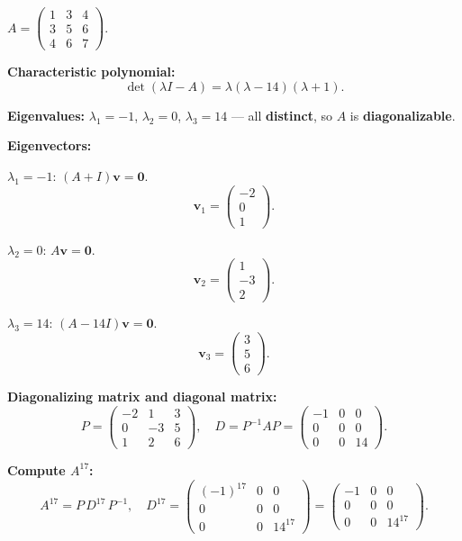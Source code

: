 \documentclass[12pt,a3paper]{article}
\begin{document}
 
\begin{tcolorbox}[enhanced,breakable,
  colback=cE!4,colframe=cE,boxrule=0.8pt,arc=5pt,
  title={\textbf{Answer --- Diagonalization of $A$; Compute $A^{17}$}},
  fonttitle=\bfseries\color{white},colbacktitle=cE]
 
$A=\begin{pmatrix}1&3&4\\3&5&6\\4&6&7\end{pmatrix}$.
 
\textbf{Characteristic polynomial:}
\[
\det(\lambda I-A) = \lambda(\lambda-14)(\lambda+1).
\]
 
\textbf{Eigenvalues:} $\lambda_1=-1$, $\lambda_2=0$, $\lambda_3=14$ --- all \textbf{distinct}, so $A$ is \textbf{diagonalizable}.
 
\medskip
\textbf{Eigenvectors:}
 
$\lambda_1=-1$:
$(A+I)\mathbf{v}=\mathbf{0}$.
\[
\mathbf{v}_1=\begin{pmatrix}-2\\0\\1\end{pmatrix}.
\]
 
$\lambda_2=0$:
$A\mathbf{v}=\mathbf{0}$.
\[
\mathbf{v}_2=\begin{pmatrix}1\\-3\\2\end{pmatrix}.
\]
 
$\lambda_3=14$:
$(A-14I)\mathbf{v}=\mathbf{0}$.
\[
\mathbf{v}_3=\begin{pmatrix}3\\5\\6\end{pmatrix}.
\]
 
\textbf{Diagonalizing matrix and diagonal matrix:}
\[
P=\begin{pmatrix}-2&1&3\\0&-3&5\\1&2&6\end{pmatrix},\quad
D=P^{-1}AP=\begin{pmatrix}-1&0&0\\0&0&0\\0&0&14\end{pmatrix}.
\]
 
\textbf{Compute $A^{17}$:}
\[
A^{17} = P\,D^{17}\,P^{-1},\quad
D^{17}=\begin{pmatrix}(-1)^{17}&0&0\\0&0&0\\0&0&14^{17}\end{pmatrix}=\begin{pmatrix}-1&0&0\\0&0&0\\0&0&14^{17}\end{pmatrix}.
\]
 

\end{tcolorbox}
\end{document}
